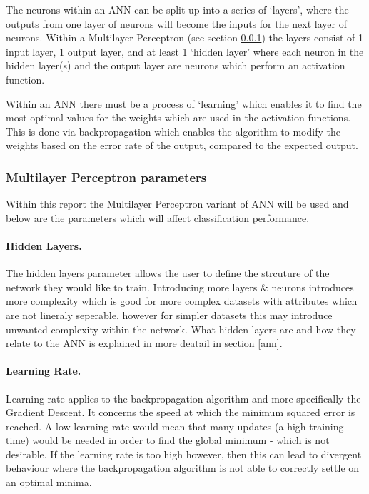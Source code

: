 \documentclass[12pt]{article}
\begin{document}
    The neurons within an ANN can be split up into a series of ‘layers’, where the outputs from one layer of neurons will become the inputs for the next layer of neurons. Within a Multilayer Perceptron (see section \ref{mlp}) the layers consist of 1 input layer, 1 output layer, and at least 1 ‘hidden layer’ where each neuron in the hidden layer(s) and the output layer are neurons which perform an activation function.

    Within an ANN there must be a process of ‘learning’ which enables it to find the most optimal values for the weights which are used in the activation functions. This is done via backpropagation which enables the algorithm to modify the weights based on the error rate of the output, compared to the expected output.

    \subsubsection{Multilayer Perceptron parameters} \label{mlp}
    Within this report the Multilayer Perceptron \citep{minsky2017perceptrons} variant of ANN will be used and below are the parameters which will affect classification performance.

      \paragraph{Hidden Layers.}
        The hidden layers parameter allows the user to define the strcuture of the network they would like to train. Introducing more layers \& neurons introduces more complexity which is good for more complex datasets with attributes which are not lineraly seperable, however for simpler datasets this may introduce unwanted complexity within the network. What hidden layers are and how they relate to the ANN is explained in more deatail in section \ref{ann}.

      \paragraph{Learning Rate.}
        Learning rate applies to the backpropagation algorithm and more specifically the Gradient Descent. It concerns the speed at which the minimum squared error is reached. A low learning rate would mean that many updates (a high training time) would be needed in order to find the global minimum - which is not desirable. If the learning rate is too high however, then this can lead to divergent behaviour where the backpropagation algorithm is not able to correctly settle on an optimal minima.
\end{document}
